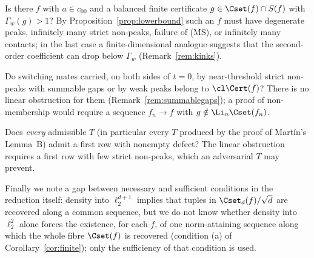 \begin{problem}\label{prob:secondorder}
Is there $f$ with $a\in c_{00}$ and a balanced finite certificate
$g\in\Cset(f)\cap S(f)$ with $\Gamma_w(g)>1$?  By
Proposition~\ref{prop:lowerbound} such an $f$ must have degenerate peaks,
infinitely many strict non-peaks, failure of (MS), or infinitely many
contacts; in the last case a finite-dimensional analogue suggests that the
second-order coefficient can drop below $\Gamma_w$ (Remark~\ref{rem:kinks}).
\end{problem}

\begin{problem}\label{prob:approx}
Do switching mates carried, on both sides of $t=0$, by near-threshold
strict non-peaks with summable gaps or by weak peaks belong to
$\cl\Cert(f)$?  There is no linear obstruction for them
(Remark~\ref{rem:summablegaps}); a proof of non-membership would require a
sequence $f_n\to f$ with $g\notin\Li_n\Cset(f_n)$.
\end{problem}

\begin{problem}\label{prob:universal}
Does \emph{every} admissible $T$ (in particular every $T$ produced by the
proof of Mart\'in's Lemma~B) admit a first row with nonempty defect?  The
linear obstruction requires a first row with few strict non-peaks, which an
adversarial $T$ may prevent.
\end{problem}

Finally we note a gap between necessary and sufficient conditions in the
reduction itself: density into $\ell_2^{d+1}$ implies that tuples in
$\Cset_d(f)/\sqrt d$ are recovered along a common sequence, but we do not
know whether density into $\ell_2^2$ alone forces the existence, for each
$f$, of one norm-attaining sequence along which the whole fibre $\Cset(f)$ is
recovered (condition (a) of Corollary~\ref{cor:finite}); only the
sufficiency of that condition is used.

